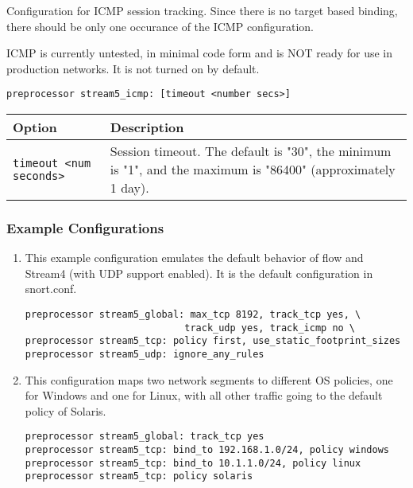\documentclass[english]{report}
\newenvironment{note}{
\samepage
    \vspace{10pt}{\textsf{
        {\hspace{7pt}\Huge{$\triangle$\hspace{-12.5pt}{\Large{$^!$}}}}\hspace{5pt}
        {\Large{NOTE}}
    }
    }
   \begin{center}
    \par\vspace{-17pt}

    \begin{lrbox}{\savepar}
    \begin{minipage}[r]{6in}
}
{
    \end{minipage}
    \end{lrbox}
    \fbox{
        \usebox{
            \savepar
	}
    }
    \par\vskip10pt
    \end{center}
}
\newenvironment{note}{
        \begin{rawhtml}
        <p><table border="1"><tr><td><b>
        Note:&nbsp;&nbsp;</b>
        \end{rawhtml}
}{
        \begin{rawhtml}
        </b></td></tr></table></p>
        \end{rawhtml}
}
\begin{document}
Configuration for ICMP session tracking.  Since there is no target based
binding, there should be only one occurance of the ICMP configuration.

\begin{note}
ICMP is currently untested, in minimal code form and is NOT ready
for use in production networks.  It is not turned on by default.
\end{note}

\begin{verbatim}
preprocessor stream5_icmp: [timeout <number secs>]
\end{verbatim}

\begin{tabular}{| l | p{3.5in} |}
\hline
\textbf{Option} & \textbf{Description}\\
\hline 
\hline 
\texttt{timeout <num seconds>} & Session timeout.  The default is "30", the minimum is "1", and the maximum is "86400" (approximately 1 day).\\
\hline
\end{tabular}

\subsubsection{Example Configurations}

\begin{enumerate}
\item{}
This example configuration emulates the default behavior of flow and
Stream4 (with UDP support enabled).  It is the default configuration in
snort.conf.

\begin{verbatim}
preprocessor stream5_global: max_tcp 8192, track_tcp yes, \
                            track_udp yes, track_icmp no \
preprocessor stream5_tcp: policy first, use_static_footprint_sizes
preprocessor stream5_udp: ignore_any_rules
\end{verbatim}

\item{}
This configuration maps two network segments to different OS policies, one
for Windows and one for Linux, with all other traffic going to the default
policy of Solaris.

\begin{verbatim}
preprocessor stream5_global: track_tcp yes
preprocessor stream5_tcp: bind_to 192.168.1.0/24, policy windows
preprocessor stream5_tcp: bind_to 10.1.1.0/24, policy linux
preprocessor stream5_tcp: policy solaris
\end{verbatim}

\end{enumerate}
\end{document}
